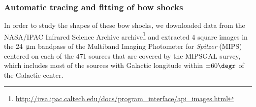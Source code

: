 \subsubsection{Automatic tracing and fitting of bow shocks}
\label{sec:autom-trac-fitt}


In order to study the shapes of these bow shocks, we downloaded data
from the NASA/IPAC Infrared Science Archive archive\footnote{
  \url{http://irsa.ipac.caltech.edu/docs/program_interface/api_images.html}}
and extracted 4\arcmin{} square images in the \SI{24}{\um} bandpass of
the Multiband Imaging Photometer for \textit{Spitzer} (MIPS) centered
on each of the 471 \citet{Kobulnicky:2016a} sources that are covered
by the MIPSGAL \citep{Carey:2009a} survey, which includes most of the
sources with Galactic longitude within \(\pm 60\degr\) of the Galactic
center.

